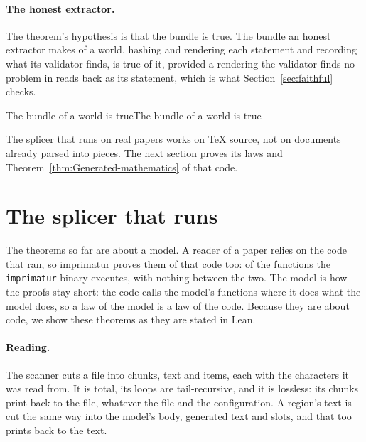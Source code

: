 \documentclass[acmsmall,screen,review,anonymous,nonacm]{acmart}
\begin{document}
\paragraph{The honest extractor.} The theorem's hypothesis is that the
bundle is true. The bundle an honest extractor makes of a world, hashing
and rendering each statement and recording what its validator finds, is
true of it, provided a rendering the validator finds no problem in reads
back as its statement, which is what Section~\ref{sec:faithful} checks.

\begin{leantheorem}[sum=EpjyBYZKqT]{The bundle of a world is true}{The bundle of a world is true}
\label{thm:The-bundle-of-a-world-is-true}
\end{leantheorem}

The splicer that runs on real papers works on \TeX{} source, not on
documents already parsed into pieces. The next section proves its laws and
Theorem~\ref{thm:Generated-mathematics} of that code.

\section{The splicer that runs}\label{sec:code}

The theorems so far are about a model. A reader of a paper relies on the
code that ran, so imprimatur proves them of that code too: of the functions
the \texttt{imprimatur} binary executes, with nothing between the two. The
model is how the proofs stay short: the code calls the model's functions
where it does what the model does, so a law of the model is a law of the
code. Because they are about code, we show these theorems as they are stated
in Lean.

\paragraph{Reading.} The scanner cuts a file into chunks, text and items,
each with the characters it was read from. It is total, its loops are
tail-recursive, and it is lossless: its chunks print back to the file,
whatever the file and the configuration.
A region's text is cut the same way into the model's body, generated text
and slots, and that too prints back to the text.
\end{document}
